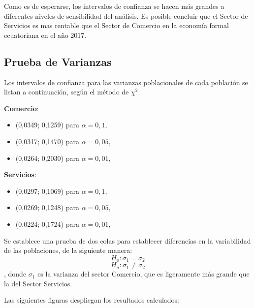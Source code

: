 \documentclass[12pt,a4paper,twoside]{article}
\begin{document}
Como es de esperarse, los intervalos de confianza se hacen más grandes a diferentes niveles de sensibilidad del análisis. Es posible concluir que el Sector de Servicios es mas rentable que el Sector de Comercio en la economía formal ecuatoriana en el año 2017. 
\subsection{Prueba de Varianzas}
Los intervalos de confianza para las varianzas poblacionales de cada población se listan a continuación, según el método de $\chi^{2}$.\par
\textbf{Comercio}:
\begin{itemize}
    \item (0,0349; 0,1259) para $\alpha=0,1$,
    \item (0,0317; 0,1470) para $\alpha=0,05$, 
    \item (0,0264; 0,2030) para $\alpha=0,01$,  
\end{itemize}
\textbf{Servicios}:
\begin{itemize}
    \item (0,0297; 0,1069) para $\alpha=0,1$,
    \item (0,0269; 0,1248) para $\alpha=0,05$, 
    \item (0,0224; 0,1724) para $\alpha=0,01$,  
\end{itemize}

Se establece una prueba de dos colas para establecer diferencias en la variabilidad de las poblaciones, de la siguiente manera: 
$$H_{o}:\sigma_{1}=\sigma_{2}$$
$$H_{a}:\sigma_{1}\neq\sigma_{2}$$
, donde $\sigma_{1}$ es la varianza del sector Comercio, que es ligeramente más grande que la del Sector Servicios. 

Las siguientes figuras despliegan los resultados calculados:

\begin{figure}[H]
\end{figure}
\begin{figure}[H]
\end{figure}
\end{document}
